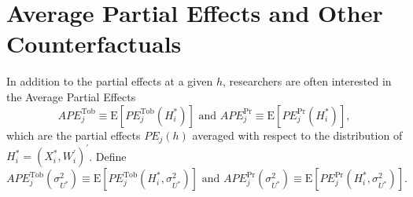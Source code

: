 \documentclass[12pt]{article}
\begin{document}
\bigskip

\section{Average Partial Effects and Other Counterfactuals}\label%
{sec:APEs}

In addition to the partial effects at a given $h$, researchers are often
interested in the Average Partial Effects%
\begin{equation}
APE_{j}^{\text{Tob}}\equiv \mathrm{E}\left[ PE_{j}^{\text{Tob}}\left(
H_{i}^{\ast }\right) \right] \text{ and }APE_{j}^{\Pr }\equiv \mathrm{E}%
\left[ PE_{j}^{\Pr }\left( H_{i}^{\ast }\right) \right] ,
\label{eq:APEs def}
\end{equation}%
which are the partial effects $PE_{j}\left( h\right) $ averaged with respect
to the distribution of {}$H_{i}^{\ast }=\left(
X_{i}^{\ast },W_{i}^{\prime }\right) ^{\prime }$. Define%
\begin{equation*}
APE_{j}^{\text{Tob}}\left( \sigma _{U^{\ast }}^{2}\right) \equiv \mathrm{E}%
\left[ PE_{j}^{\text{Tob}}\left( H_{i}^{\ast },\sigma _{U^{\ast
}}^{2}\right) \right] \text{ and }APE_{j}^{\Pr }\left( \sigma _{U^{\ast
}}^{2}\right) \equiv \mathrm{E}\left[ PE_{j}^{\Pr }\left( H_{i}^{\ast
},\sigma _{U^{\ast }}^{2}\right) \right] .
\end{equation*}
\end{document}
